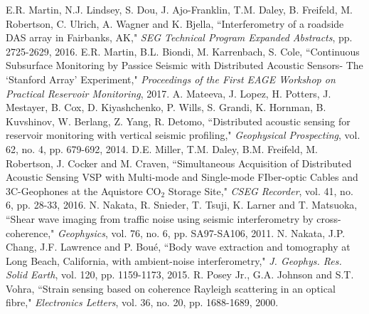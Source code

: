 \documentclass[11pt]{article}
\begin{document}
\begin{thebibliography}{30}
\vspace{-0.2cm}
 E.R. Martin, N.J. Lindsey, S. Dou, J. Ajo-Franklin, T.M. Daley, B. Freifeld, M. Robertson, C. Ulrich, A. Wagner and K. Bjella, ``Interferometry of a roadside DAS array in Fairbanks, AK," \textit{SEG Technical Program Expanded Abstracts}, pp. 2725-2629, 2016.
\vspace{-0.2cm}
 E.R. Martin, B.L. Biondi, M. Karrenbach, S. Cole, ``Continuous Subsurface Monitoring by Passice Seismic with Distributed Acoustic Sensors- The `Stanford Array' Experiment," \textit{Proceedings of the First EAGE Workshop on Practical Reservoir Monitoring}, 2017.
\vspace{-0.2cm}
 A. Mateeva, J. Lopez, H. Potters, J. Mestayer, B. Cox, D. Kiyashchenko, P. Wills, S. Grandi, K. Hornman, B. Kuvshinov, W. Berlang, Z. Yang, R. Detomo, ``Distributed acoustic sensing for reservoir monitoring with vertical seismic profiling," \textit{Geophysical Prospecting}, vol. 62, no. 4, pp. 679-692, 2014.
\vspace{-0.2cm}
 D.E. Miller, T.M. Daley, B.M. Freifeld, M. Robertson, J. Cocker and M. Craven, ``Simultaneous Acquisition of Distributed Acoustic Sensing VSP with Multi-mode and Single-mode FIber-optic Cables and 3C-Geophones at the Aquistore CO$_2$ Storage Site," \textit{CSEG Recorder}, vol. 41, no. 6, pp. 28-33, 2016.
\vspace{-0.2cm}
 N. Nakata, R. Snieder, T. Tsuji, K. Larner and T. Matsuoka, ``Shear wave imaging from traffic noise using seismic interferometry by cross-coherence," \textit{Geophysics}, vol. 76, no. 6, pp. SA97-SA106, 2011.
\vspace{-0.2cm}
 N. Nakata, J.P. Chang, J.F. Lawrence and P. Bou\'{e}, ``Body wave extraction and tomography at Long Beach, California, with ambient-noise interferometry," \textit{J. Geophys. Res. Solid Earth}, vol. 120, pp. 1159-1173, 2015.
\vspace{-0.2cm}
 R. Posey Jr., G.A. Johnson and S.T. Vohra, ``Strain sensing based on coherence Rayleigh scattering in an optical fibre," \textit{Electronics Letters}, vol. 36, no. 20, pp. 1688-1689, 2000.

\end{thebibliography}
\end{document}
